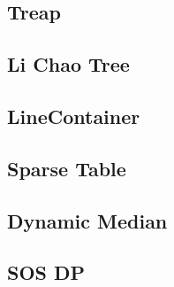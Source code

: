 \documentclass[a4paper,10pt,twocolumn,oneside,x11names]{article}
\begin{document}
\subsection{Treap}


% 

\subsection{Li Chao Tree}


\subsection{LineContainer}


\subsection{Sparse Table}


% 

\subsection{Dynamic Median}


\subsection{SOS DP}





\end{document}
